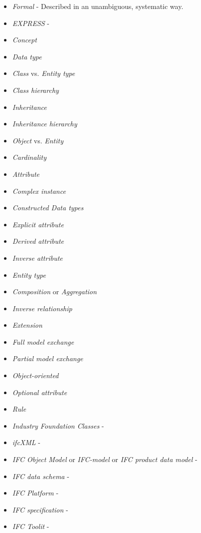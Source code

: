 \begin{itemize}
    
    \item \emph{Formal} - Described in an unambiguous, systematic way.
    \item \emph{EXPRESS} - 
    \item \emph{Concept}
    \item \emph{Data type} 
    \item \emph{Class} vs. \emph{Entity type}
    \item \emph{Class hierarchy} 
    \item \emph{Inheritance} 
    \item \emph{Inheritance hierarchy} 
    \item \emph{Object} vs. \emph{Entity}
    \item \emph{Cardinality} 
    \item \emph{Attribute} 
    \item \emph{Complex instance}
    \item \emph{Constructed Data types}
    \item \emph{Explicit attribute} 
    \item \emph{Derived attribute} 
    \item \emph{Inverse attribute} 
    \item \emph{Entity type} 
    \item \emph{Composition} or \emph{Aggregation}
    \item \emph{Inverse relationship}
    \item \emph{Extension}
    \item \emph{Full model exchange}
    \item \emph{Partial model exchange}
    \item \emph{Object-oriented}
    \item \emph{Optional attribute}
    \item \emph{Rule} 
    
    
    \item \emph{Industry Foundation Classes} - 
    \item \emph{ifcXML} - 
    \item \emph{IFC Object Model} or \emph{IFC-model} or \emph{IFC product data model} - 
    \item \emph{IFC data schema} - 
    \item \emph{IFC Platform} - 
    \item \emph{IFC specification} - 
    \item \emph{IFC Toolit} - 

    
    

\end{itemize}
